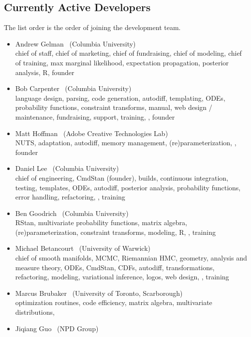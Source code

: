 \subsection*{Currently Active Developers}

The list order is the order of joining the development team.

\begin{itemize}
\item Andrew Gelman \ (Columbia University)
\\ {\footnotesize chief of staff, chief of marketing, chief of
  fundraising, chief of modeling, chief of training, max marginal
  likelihood, expectation propagation, posterior analysis, R, founder}
\item Bob Carpenter \ (Columbia University) \\ {\footnotesize language
    design, parsing, code generation, autodiff, templating, ODEs,
    probability functions, constraint transforms, manual, web design /
    maintenance, fundraising, support, training, \Cpp, founder}
\item Matt Hoffman \ (Adobe Creative Technologies Lab)
\\ {\footnotesize NUTS, adaptation, autodiff, memory management,
  (re)parameterization, \Cpp, founder}
\item Daniel Lee \   (Columbia University)
\\ {\footnotesize chief of engineering, CmdStan (founder), builds, continuous
  integration, testing, templates, ODEs, autodiff,
  posterior analysis, probability functions, error handling,
  refactoring, \Cpp, training}
\item Ben Goodrich \   (Columbia University)
\\ {\footnotesize RStan, multivariate probability functions, matrix algebra,
  (re)parameterization, constraint transforms, modeling, R, \Cpp, training}
\item Michael Betancourt \ (University of Warwick) \\
  {\footnotesize chief of smooth manifolds, MCMC, Riemannian HMC,
    geometry, analysis and measure theory, ODEs, CmdStan, CDFs,
    autodiff, transformations, refactoring, modeling, variational
    inference, logos, web design, \Cpp, training}
\item Marcus Brubaker \   (University of Toronto, Scarborough)
\\ {\footnotesize optimization routines, code efficiency, matrix
  algebra, multivariate distributions, \Cpp}
\item Jiqiang Guo \   (NPD Group)

\end{itemize}
